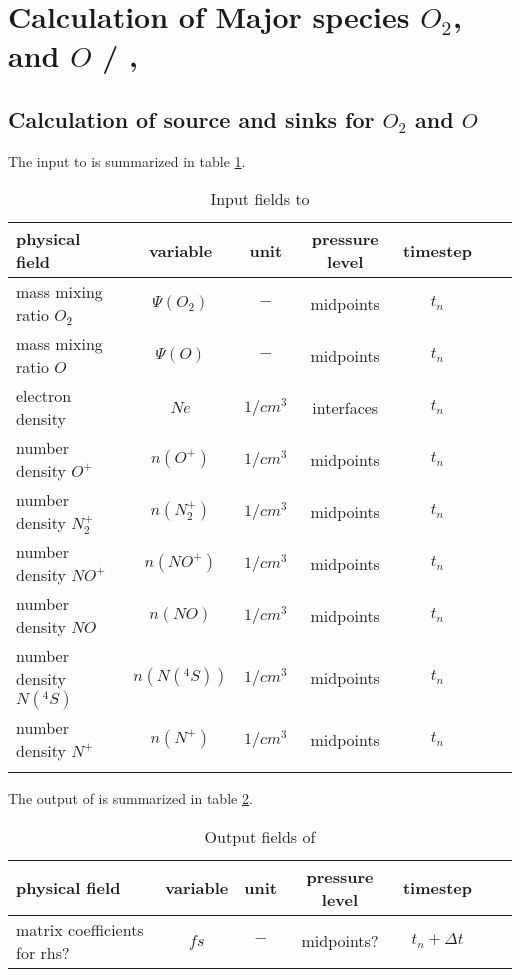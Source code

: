 %
\section{Calculation of Major species $O_2$, and $O$ / , }\label{cap:comp_o2o}
%
\subsection{Calculation of source and sinks for $O_2$ and $O$}\label{subcap:comp_o2o}
%
The input to  is summarized in table
\ref{tab:input_comp_o2o}.
%
\begin{table}[tb]
\begin{tabular}{|p{3.5cm} ||c|c|c|c|c|c|} \hline
physical field               & variable        & unit&pressure
level& timestep
\\ \hline \hline
%
mass mixing ratio $O_2$ &       $\Psi(O_2)$              & $-$   &  midpoints & $t_n$\\
mass mixing ratio $O$ &         $\Psi(O  )$              & $-$   &  midpoints & $t_n$\\
electron density&       $Ne$              & $1/cm^3$   &  interfaces & $t_n$\\
number density $O^+$&       $n(O^+)$              & $1/cm^3$   &  midpoints & $t_n$\\
number density $N_2^+$&       $n(N_2^+)$              & $1/cm^3$   &  midpoints & $t_n$\\
number density $NO^+$&       $n(NO^+)$              & $1/cm^3$   &  midpoints & $t_n$\\
number density $NO$&       $n(NO)$              & $1/cm^3$   &  midpoints & $t_n$\\
number density $N(^4S)$&       $n(N(^4S))$              & $1/cm^3$   &  midpoints & $t_n$\\
number density $N^+$&       $n(N^+)$              & $1/cm^3$   &  midpoints & $t_n$\\

 \\ \hline
\end{tabular}
\caption{Input fields to }
\label{tab:input_comp_o2o}
\end{table}
%
The output of  is summarized in table
\ref{tab:output_comp_o2o}.
%
\begin{table}[tb]
\begin{tabular}{|p{3.5cm} ||c|c|c|c|c|c|} \hline
physical field               & variable        & unit&pressure
level& timestep \\ \hline \hline matrix coefficients for rhs? & $fs$
& $-$ & midpoints? & $t_n+\Delta t$
\\ \hline \hline
\end{tabular}
\caption{Output fields of }
\label{tab:output_comp_o2o}
\end{table}
